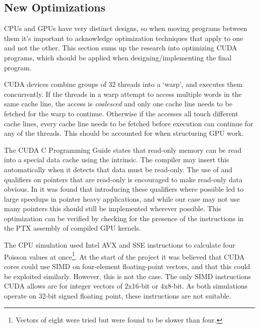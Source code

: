 \subsection{New Optimizations}
\label{sec:FutureOptimization}
CPUs and GPUs have very distinct designs, so when moving programs between them it's important to acknowledge optimization techniques that apply to one and not the other.
This section sums up the research into optimizing CUDA programs, which should be applied when designing/implementing the final program.

CUDA devices combine groups of 32 threads into a `warp', and executes them concurrently\cite{tool:CUDAProgrammingV1}.
If the threads in a warp attempt to access multiple words in the same cache line, the access is \textit{coalesced}\cite{NVIDIAHowBlog} and only one cache line needs to be fetched for the warp to continue.
Otherwise if the accesses all touch different cache lines, every cache line needs to be fetched before execution can continue for any of the threads.
This should be accounted for when structuring GPU work.

The CUDA C Programming Guide\cite{NVIDIAGlobalGuide} states that read-only memory can be read into a special data cache using the  intrinsic.
The compiler may insert this automatically when it detects that data must be read-only.
The use of  and  qualifiers on pointers that are read-only is encouraged to make read-only data obvious.
In \cite{10.1145/3238147.3241533} it was found that introducing these qualifiers where possible led to large speedups in pointer heavy applications, and while our case may not use many pointers this should still be implemented wherever possible.
This optimization can be verified by checking for the presence of the \cite{NvidiaPTX} instructions in the PTX assembly of compiled GPU kernels.

The CPU simulation used Intel AVX and SSE instructions\cite{IntelCorporationIntroductionExtensions} to calculate four Poisson values at once\footnote{Vectors of eight were tried but were found to be slower than four.}.
At the start of the project it was believed that CUDA cores could use SIMD on four-element floating-point vectors, and that this could be exploited similarly.
However, this is not the case.
The only SIMD instructions CUDA allows are for integer vectors of 2x16-bit or 4x8-bit\cite{NvidiaCUDASIMD}.%
As both simulations operate on 32-bit signed floating point, these instructions are not suitable.

